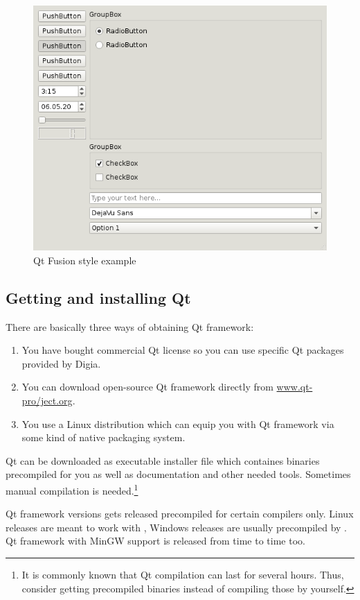 \begin{figure}[ht]
\centering\includegraphics{graphics/laboratory/01-fusion.png}
\caption{Qt Fusion style example}\label{figure:fusion}
\end{figure}

\subsection{Getting and installing Qt}
There are basically three ways of obtaining Qt framework:
\begin{enumerate}
\item You have bought commercial Qt license so you can use specific Qt packages provided by Digia.
\item You can download open-source Qt framework directly from \href{http://www.qt-project.org/}{www.qt-pro\-/ject.org}.
\item You use a Linux distribution which can equip you with Qt framework via some kind of native packaging system.
\end{enumerate}

Qt can be downloaded as executable installer file which containes binaries precompiled for you as well as documentation and other needed tools. Sometimes manual compilation is needed.\footnote{It is commonly known that Qt compilation can last for several hours. Thus, consider getting precompiled binaries instead of compiling those by yourself.}

Qt framework versions gets released precompiled for certain compilers only. Linux releases are meant to work with , Windows releases are usually precompiled by . Qt framework with MinGW support is released from time to time too.

